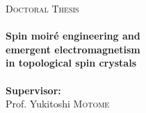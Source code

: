 \begin{titlepage}
\center
\textsc{\LARGE Doctoral Thesis}\\[1.5cm]
\HRule \\[0.6cm]
\fontsize{22pt}{24pt}\selectfont
{\bf
Spin moir\'{e} engineering and \\
emergent electromagnetism\\ 
in topological spin crystals
}
\\[0.3cm]
\HRule \\[1.5cm]
\Large {\bf Supervisor:}\\
Prof. Yukitoshi \textsc{Motome}\\[2cm]

\end{titlepage}
